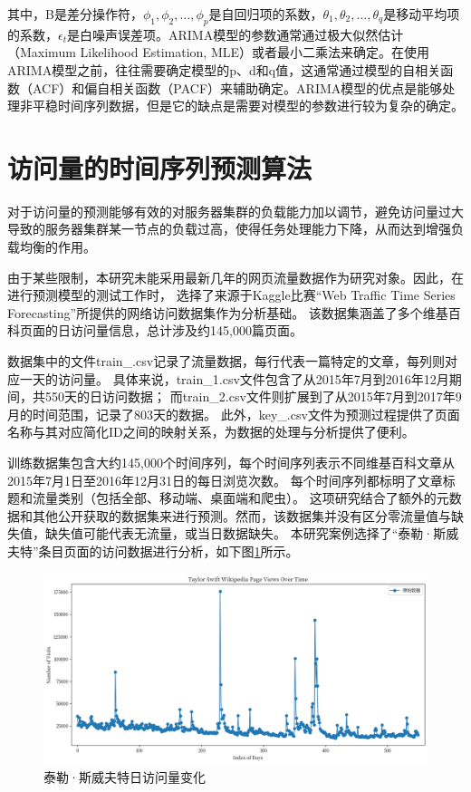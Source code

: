 其中，B是差分操作符，$\phi_1, \phi_2, \ldots, \phi_p$是自回归项的系数，$\theta_1, \theta_2, \ldots, \theta_q$是移动平均项的系数，$\epsilon_t$是白噪声误差项。ARIMA模型的参数通常通过极大似然估计（Maximum Likelihood Estimation, MLE）或者最小二乘法来确定。在使用ARIMA模型之前，往往需要确定模型的p、d和q值，这通常通过模型的自相关函数（ACF）和偏自相关函数（PACF）来辅助确定。ARIMA模型的优点是能够处理非平稳时间序列数据，但是它的缺点是需要对模型的参数进行较为复杂的确定。

\section{访问量的时间序列预测算法}

对于访问量的预测能够有效的对服务器集群的负载能力加以调节，避免访问量过大导致的服务器集群某一节点的负载过高，使得任务处理能力下降，从而达到增强负载均衡的作用。

由于某些限制，本研究未能采用最新几年的网页流量数据作为研究对象。因此，在进行预测模型的测试工作时，
选择了来源于Kaggle比赛“Web Traffic Time Series Forecasting”所提供的网络访问数据集作为分析基础。
该数据集涵盖了多个维基百科页面的日访问量信息，总计涉及约145,000篇页面。

数据集中的文件train\_.csv记录了流量数据，每行代表一篇特定的文章，每列则对应一天的访问量。
具体来说，train\_1.csv文件包含了从2015年7月到2016年12月期间，共550天的日访问数据；
而train\_2.csv文件则扩展到了从2015年7月到2017年9月的时间范围，记录了803天的数据。
此外，key\_.csv文件为预测过程提供了页面名称与其对应简化ID之间的映射关系，为数据的处理与分析提供了便利。

训练数据集包含大约145,000个时间序列，每个时间序列表示不同维基百科文章从2015年7月1日至2016年12月31日的每日浏览次数。
每个时间序列都标明了文章标题和流量类别（包括全部、移动端、桌面端和爬虫）。
这项研究结合了额外的元数据和其他公开获取的数据集来进行预测。然而，该数据集并没有区分零流量值与缺失值，缺失值可能代表无流量，或当日数据缺失。
本研究案例选择了“泰勒·斯威夫特”条目页面的访问数据进行分析，如下图\ref{Taylor_swift}所示。

\begin{figure}[htb]
	\centering
	\includegraphics[width=\textwidth]{figures/taylor_source.png}
	\caption{泰勒·斯威夫特日访问量变化}
	\label{Taylor_swift}
\end{figure}

